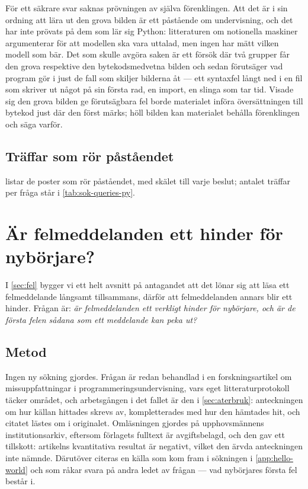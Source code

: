 För ett säkrare svar saknas prövningen av själva förenklingen.  Att det
är i sin ordning att lära ut den grova bilden är ett påstående om
undervisning, och det har inte prövats på dem som lär sig Python:
litteraturen om notionella maskiner argumenterar för att modellen ska
vara uttalad, men ingen har mätt vilken modell som bär.  Det som skulle
avgöra saken är ett försök där två grupper får den grova respektive den
bytekodsmedvetna bilden och sedan förutsäger vad program gör i just de
fall som skiljer bilderna åt --- ett syntaxfel långt ned i en fil som
skriver ut något på sin första rad, en import, en slinga som tar tid.
Visade sig den grova bilden ge förutsägbara fel borde materialet införa
översättningen till bytekod just där den först märks; höll bilden kan
materialet behålla förenklingen och säga varför.

\section{Träffar som rör påståendet}
\label{sec:py-traffar}

 listar de poster som rör påståendet, med
skälet till varje beslut; antalet träffar per fråga står i
\cref{tab:sok-queries-py}.



\chapter{Är felmeddelanden ett hinder för nybörjare?}
\label{app:felmeddelanden}

I \cref{sec:fel} bygger vi ett helt avsnitt på antagandet att det lönar
sig att läsa ett felmeddelande långsamt tillsammans, därför att
felmeddelanden annars blir ett hinder.  Frågan är: \emph{är
felmeddelanden ett verkligt hinder för nybörjare, och är de första felen
sådana som ett meddelande kan peka ut?}

\section{Metod}
\label{sec:fel-metod}

Ingen ny sökning gjordes.  Frågan är redan behandlad i en
forskningsartikel om missuppfattningar i programmeringsundervisning, vars
eget litteraturprotokoll täcker området, och arbetsgången i det fallet är
den i \cref{sec:aterbruk}: anteckningen om hur källan hittades skrevs av,
kompletterades med hur den hämtades hit, och citatet lästes om i
originalet.  Omläsningen gjordes på upphovsmännens
institutionsarkiv\autocite{Prather2017CEM}, eftersom förlagets fulltext
är avgiftsbelagd, och den gav ett tillskott: artikelns kvantitativa
resultat är negativt, vilket den ärvda anteckningen inte nämnde.
Därutöver citeras en källa som kom fram i sökningen i
\cref{app:hello-world} och som råkar svara på andra ledet av frågan ---
vad nybörjares första fel består i\autocite{Jeffries2022Hello}.

